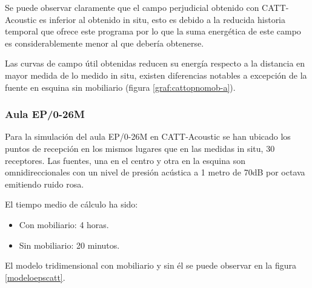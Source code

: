 Se puede observar claramente que el campo perjudicial obtenido con CATT-Acoustic es inferior al obtenido in situ, esto es debido a la reducida historia temporal que ofrece este programa por lo que la suma energética de este campo es considerablemente menor al que debería obtenerse.

Las curvas de campo útil obtenidas reducen su energía respecto a la distancia en mayor medida de lo medido in situ, existen diferencias notables a excepción de la fuente en esquina sin mobiliario (figura \ref{graf:cattopnomob-a}).

\subsubsection{Aula EP/0-26M}
\label{catteps}

Para la simulación del aula EP/0-26M en CATT-Acoustic se han ubicado los puntos de recepción en los mismos lugares que en las medidas in situ, 30 receptores. Las fuentes, una en el centro y otra en la esquina son omnidireccionales con un nivel de presión acústica a 1 metro de 70dB por octava emitiendo ruido rosa.

El tiempo medio de cálculo ha sido:
\begin{itemize}
\itemsep0em
  \item Con mobiliario: 4 horas.
  \item Sin mobiliario: 20 minutos.
\end{itemize}

El modelo tridimensional con mobiliario y sin él se puede observar en la figura \ref{modeloepscatt}.

